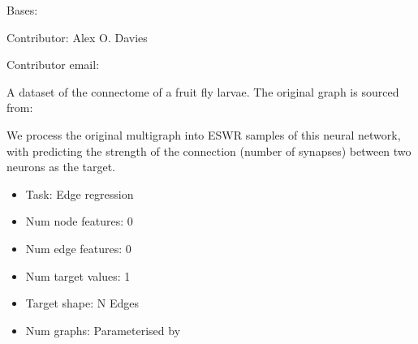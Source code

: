 \documentclass[letterpaper,10pt,english]{sphinxhowto}
\begin{document}
\begin{fulllineitems}
\label{\detokenize{datasets/real:datasets.real.NeuralDataset}}
\pysigstartsignatures
{}
\pysigstopsignatures
\sphinxAtStartPar
Bases: 

\sphinxAtStartPar
Contributor: Alex O. Davies

\sphinxAtStartPar
Contributor email: 

\sphinxAtStartPar
A dataset of the connectome of a fruit fly larvae.
The original graph is sourced from:
\begin{quote}

\sphinxAtStartPar
{}
\end{quote}

\sphinxAtStartPar
We process the original multigraph into ESWR samples of this neural network, with predicting the strength of the connection (number of synapses) between two neurons as the target.
\begin{itemize}
\item {} 
\sphinxAtStartPar
Task: Edge regression

\item {} 
\sphinxAtStartPar
Num node features: 0

\item {} 
\sphinxAtStartPar
Num edge features: 0

\item {} 
\sphinxAtStartPar
Num target values: 1

\item {} 
\sphinxAtStartPar
Target shape: N Edges

\item {} 
\sphinxAtStartPar
Num graphs: Parameterised by 


\end{itemize}
\end{fulllineitems}
\end{document}
